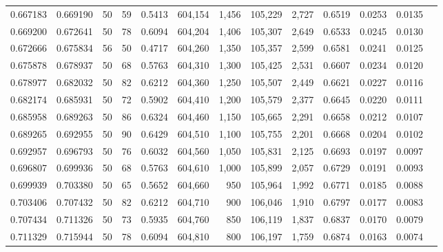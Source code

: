 \begin{tabular}{rrrrrrrrrrrrr}
0.667183 & 0.669190 &    50 &  59 &                                     0.5413 & 604,154 &   1,456 & 105,229 &   2,727 & 0.6519 & 0.0253 & 0.0135 \\
0.669200 & 0.672641 &    50 &  78 &                                     0.6094 & 604,204 &   1,406 & 105,307 &   2,649 & 0.6533 & 0.0245 & 0.0130 \\
0.672666 & 0.675834 &    56 &  50 &                                     0.4717 & 604,260 &   1,350 & 105,357 &   2,599 & 0.6581 & 0.0241 & 0.0125 \\
0.675878 & 0.678937 &    50 &  68 &                                     0.5763 & 604,310 &   1,300 & 105,425 &   2,531 & 0.6607 & 0.0234 & 0.0120 \\
0.678977 & 0.682032 &    50 &  82 &                                     0.6212 & 604,360 &   1,250 & 105,507 &   2,449 & 0.6621 & 0.0227 & 0.0116 \\
0.682174 & 0.685931 &    50 &  72 &                                     0.5902 & 604,410 &   1,200 & 105,579 &   2,377 & 0.6645 & 0.0220 & 0.0111 \\
0.685958 & 0.689263 &    50 &  86 &                                     0.6324 & 604,460 &   1,150 & 105,665 &   2,291 & 0.6658 & 0.0212 & 0.0107 \\
0.689265 & 0.692955 &    50 &  90 &                                     0.6429 & 604,510 &   1,100 & 105,755 &   2,201 & 0.6668 & 0.0204 & 0.0102 \\
0.692957 & 0.696793 &    50 &  76 &                                     0.6032 & 604,560 &   1,050 & 105,831 &   2,125 & 0.6693 & 0.0197 & 0.0097 \\
0.696807 & 0.699936 &    50 &  68 &                                     0.5763 & 604,610 &   1,000 & 105,899 &   2,057 & 0.6729 & 0.0191 & 0.0093 \\
0.699939 & 0.703380 &    50 &  65 &                                     0.5652 & 604,660 &     950 & 105,964 &   1,992 & 0.6771 & 0.0185 & 0.0088 \\
0.703406 & 0.707432 &    50 &  82 &                                     0.6212 & 604,710 &     900 & 106,046 &   1,910 & 0.6797 & 0.0177 & 0.0083 \\
0.707434 & 0.711326 &    50 &  73 &                                     0.5935 & 604,760 &     850 & 106,119 &   1,837 & 0.6837 & 0.0170 & 0.0079 \\
0.711329 & 0.715944 &    50 &  78 &                                     0.6094 & 604,810 &     800 & 106,197 &   1,759 & 0.6874 & 0.0163 & 0.0074 \\

\end{tabular}
